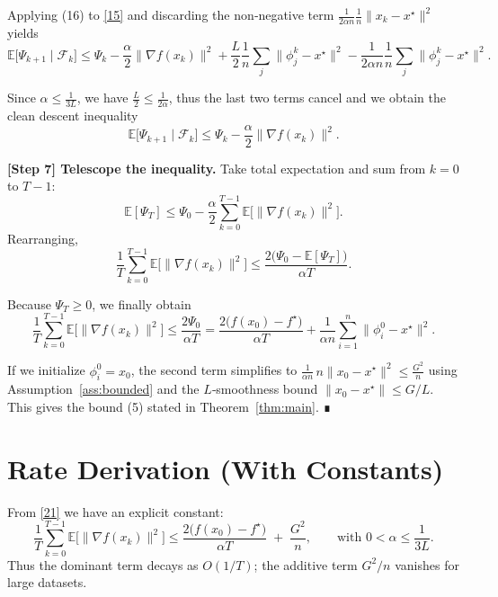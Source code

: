 \documentclass{article}
\newcommand{\EE}{\mathbb{E}}
\begin{document}
Applying (16) to \eqref{15} and discarding the non‑negative term $\frac{1}{2\alpha n}\frac1n\|x_k-x^{\star}\|^{2}$ yields
\[
\EE\!\bigl[\Psi_{k+1}\mid\mathcal{F}_k\bigr]
\le \Psi_k
-\frac{\alpha}{2}\|\nabla f(x_k)\|^{2}
+\frac{L}{2}\frac1n\sum_{j}\|\phi_j^{k}-x^{\star}\|^{2}
-\frac{1}{2\alpha n}\frac1n\sum_{j}\|\phi_j^{k}-x^{\star}\|^{2}.
\tag{17}
\]

Since $\alpha\le\frac{1}{3L}$, we have $\frac{L}{2}\le\frac{1}{2\alpha}$, thus the last two terms cancel and we obtain the clean descent inequality
\[
\EE\!\bigl[\Psi_{k+1}\mid\mathcal{F}_k\bigr]
\le \Psi_k-\frac{\alpha}{2}\|\nabla f(x_k)\|^{2}.
\tag{18}
\]

\noindent\textbf{[Step 7] Telescope the inequality.}  
Take total expectation and sum from $k=0$ to $T-1$:
\[
\EE[\Psi_T]\le \Psi_0-\frac{\alpha}{2}\sum_{k=0}^{T-1}\EE\bigl[\|\nabla f(x_k)\|^{2}\bigr].
\tag{19}
\]
Rearranging,
\[
\frac{1}{T}\sum_{k=0}^{T-1}\EE\bigl[\|\nabla f(x_k)\|^{2}\bigr]
\le \frac{2\bigl(\Psi_0-\EE[\Psi_T]\bigr)}{\alpha T}.
\tag{20}
\]

Because $\Psi_T\ge 0$, we finally obtain
\[
\frac{1}{T}\sum_{k=0}^{T-1}\EE\bigl[\|\nabla f(x_k)\|^{2}\bigr]
\le \frac{2\Psi_0}{\alpha T}
= \frac{2\bigl(f(x_0)-f^{\star}\bigr)}{\alpha T}
   +\frac{1}{\alpha n}\sum_{i=1}^{n}\|\phi_i^{0}-x^{\star}\|^{2}.
\tag{21}
\]

If we initialize $\phi_i^{0}=x_0$, the second term simplifies to $\frac{1}{\alpha n}\,n\|x_0-x^{\star}\|^{2}\le\frac{G^{2}}{n}$ using Assumption~\ref{ass:bounded} and the $L$‑smoothness bound $\|x_0-x^{\star}\|\le G/L$. This gives the bound (5) stated in Theorem~\ref{thm:main}.  ∎

\section*{Rate Derivation (With Constants)}
From \eqref{21} we have an explicit constant:
\[
\boxed{
\frac{1}{T}\sum_{k=0}^{T-1}\EE\bigl[\|\nabla f(x_k)\|^{2}\bigr]
\le
\frac{2\bigl(f(x_0)-f^{\star}\bigr)}{\alpha T}
\;+\;
\frac{G^{2}}{n}
},
\qquad
\text{with }0<\alpha\le\frac{1}{3L}.
\]
Thus the dominant term decays as $O(1/T)$; the additive term $G^{2}/n$ vanishes for large datasets.

\end{document}
